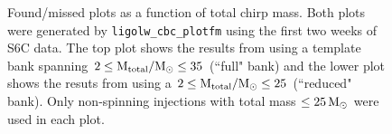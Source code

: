 \begin{figure}[p]
\center
{}
\label{fig:smaller_bank_investigation-lowmass}
\caption{Found/missed plots as a function of total chirp mass. Both plots were
generated by \texttt{ligolw\_cbc\_plotfm} using the first two weeks of S6C
data. The top plot shows the results from using a template bank spanning $2
\leq \mathrm{M_{total}}/\mathrm{M_\odot} \leq 35$ (``full" bank) and the lower plot shows the resuts
from using a $2 \leq \mathrm{M_{total}}/\mathrm{M_\odot} \leq 25$ (``reduced" bank). Only
non-spinning injections with total mass $\leq 25\,\mathrm{M_\odot}$ were used in each
plot.}
\end{figure}

